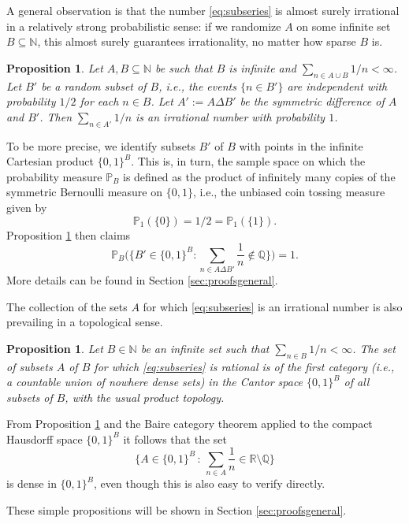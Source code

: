 \documentclass[11pt,letterpaper,reqno]{amsart}
\numberwithin{equation}{section}
\newtheorem{proposition}[theorem]{Proposition}
\theoremstyle{definition}
\numberwithin{equation}{section}
\begin{document}
A general observation is that the number \eqref{eq:subseries} is almost surely irrational in a relatively strong probabilistic sense: if we randomize $A$ on some infinite set $B\subseteq\mathbb{N}$, this almost surely guarantees irrationality, no matter how sparse $B$ is.

\begin{proposition}\label{prop:randomized}
Let $A, B \subseteq \mathbb{N}$ be such that $B$ is infinite and $\sum_{n\in A\cup B} 1/n < \infty$. Let $B'$ be a random subset of $B$, i.e., the events $\{n\in B'\}$ are independent with probability $1/2$ for each $n \in B$. Let $A' := A \Delta B'$ be the symmetric difference of $A$ and $B'$. Then $\sum_{n\in A'} 1/n$ is an irrational number with probability $1$.
\end{proposition}

To be more precise, we identify subsets $B'$ of $B$ with points in the infinite Cartesian product $\{0,1\}^B$. This is, in turn, the sample space on which the probability measure $\mathbb{P}_B$ is defined as the product of infinitely many copies of the symmetric Bernoulli measure on $\{0,1\}$, i.e., the unbiased coin tossing measure given by
\[ \mathbb{P}_1(\{0\})=1/2=\mathbb{P}_1(\{1\}). \]
Proposition \ref{prop:randomized} then claims
\[ \mathbb{P}_B\Big(\Big\{B'\in\{0,1\}^B : \sum_{n\in A \Delta B'}\frac{1}{n}\not\in\mathbb{Q}\Big\}\Big) = 1. \]
More details can be found in Section \ref{sec:proofsgeneral}.

\smallskip
The collection of the sets $A$ for which \eqref{eq:subseries} is  an irrational number is also prevailing in a topological sense.

\begin{proposition}\label{prop:nowheredense}
Let $B\in\mathbb{N}$ be an infinite set such that $\sum_{n\in B} 1/n <\infty$. The set of subsets $A$ of $B$ for which \eqref{eq:subseries} is rational is of the first category (i.e., a countable union of nowhere dense sets) in the Cantor space $\{0,1\}^{B}$ of all subsets of $B$, with the usual product topology.
\end{proposition}

From Proposition \ref{prop:nowheredense} and the Baire category theorem applied to the compact Hausdorff space $\{0,1\}^B$ it follows that the set
\[ \Big\{ A\in\{0,1\}^B \,:\, \sum_{n\in A} \frac{1}{n} \in \mathbb{R}\setminus\mathbb{Q} \Big\} \]
is dense in $\{0,1\}^B$, even though this is also easy to verify directly.

These simple propositions will be shown in Section \ref{sec:proofsgeneral}.
\end{document}
